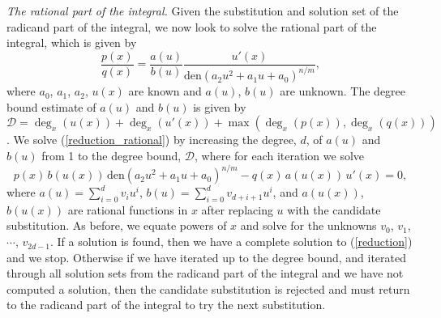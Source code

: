 \documentclass[12pt]{article}
\numberwithin{equation}{section}
\theoremstyle{definition}
\begin{document}
\textit{The rational part of the integral.} Given the substitution and solution set of 
the radicand part of the integral, we now look to solve the rational part of the integral, 
which is given by 
\begin{equation}
\frac{p(x)}{q(x)} = \frac{a(u)}{b(u)}\frac{u'(x)}{\text{den}\left(a_2u^2+a_1u+a_0\right)^{n/m}}, \label{reduction_rational}
\end{equation}
where $a_0$, $a_1$, $a_2$, $u(x)$ are known and $a(u)$, $b(u)$ are unknown. The degree bound estimate  
of $a(u)$ and $b(u)$ is given by $\mathcal{D} = \deg_x(u(x)) + \deg_x(u'(x)) + \max\left( \deg_x(p(x)), \deg_x(q(x)) \right)$. We solve 
(\ref{reduction_rational}) by increasing the degree, $d$, of $a(u)$ and $b(u)$ from 1 to the degree 
bound, $\mathcal{D}$, where for each iteration we solve
\begin{equation*}
p(x)\,b(u(x))\,\text{den}\left(a_2u^2 + a_1u + a_0\right)^{n/m} - q(x)\,a(u(x))\,u'(x) = 0,
\end{equation*}
where $a(u) = \sum\limits_{i=0}^d v_i u^i$, $b(u) = \sum\limits_{i=0}^d v_{d+i+1} u^i$, and 
$a(u(x))$, $b(u(x))$ are rational functions in $x$ after replacing $u$ with the candidate 
substitution. As before, we equate powers of $x$ and solve for the unknowns $v_0$, $v_1$, 
$\cdots$, $v_{2d-1}$. If a solution is found, then we have a complete solution to 
(\ref{reduction}) and we stop. Otherwise if we have iterated up to the degree bound, and 
iterated through all solution sets from the radicand part of the integral and we have not 
computed a solution, then the candidate substitution is rejected and must return to the 
radicand part of the integral to try the next substitution.
\iffalse
\end{document}
